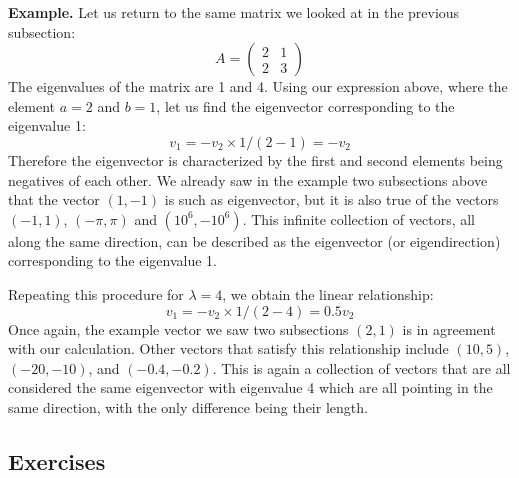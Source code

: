 \documentclass[
  letterpaper,
  DIV=11,
  numbers=noendperiod]{scrreprt}
\begin{document}
\textbf{Example.} Let us return to the same matrix we looked at in the
previous subsection: \[ 
A = \left(\begin{array}{cc}2 & 1 \\ 2& 3\end{array}\right)
\] The eigenvalues of the matrix are 1 and 4. Using our expression
above, where the element \(a=2\) and \(b=1\), let us find the
eigenvector corresponding to the eigenvalue 1: \[ 
v_1 = - v_2 \times  1/(2-1) = - v_2
\] Therefore the eigenvector is characterized by the first and second
elements being negatives of each other. We already saw in the example
two subsections above that the vector \((1,-1)\) is such as eigenvector,
but it is also true of the vectors \((-1,1)\), \((-\pi, \pi)\) and
\((10^6, -10^6)\). This infinite collection of vectors, all along the
same direction, can be described as the eigenvector (or eigendirection)
corresponding to the eigenvalue 1.

Repeating this procedure for \(\lambda = 4\), we obtain the linear
relationship: \[ v_1 = - v_2 \times  1/(2-4) = 0.5 v_2\] Once again, the
example vector we saw two subsections \((2,1)\) is in agreement with our
calculation. Other vectors that satisfy this relationship include
\((10,5)\), \((-20,-10)\), and \((-0.4,-0.2)\). This is again a
collection of vectors that are all considered the same eigenvector with
eigenvalue 4 which are all pointing in the same direction, with the only
difference being their length.

\hypertarget{exercises-31}{%
\subsection{Exercises}\label{exercises-31}}
\end{document}

